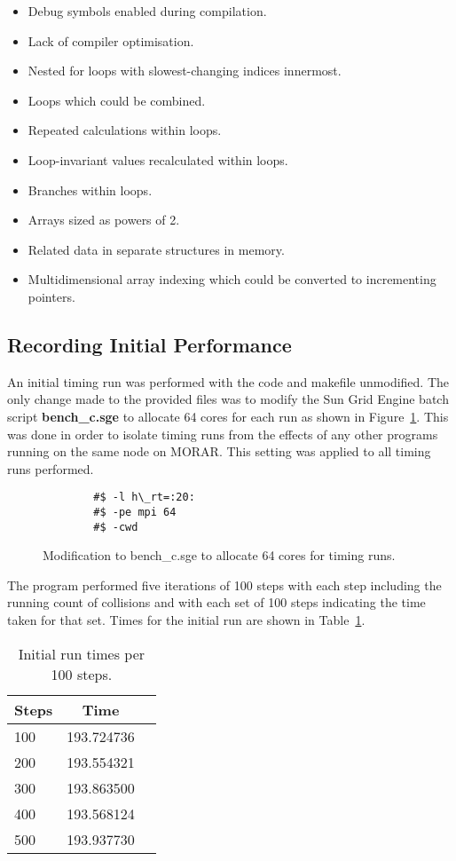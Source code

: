 \documentclass[11pt, oneside]{article}   %
\begin{document}
\begin{itemize}
	\item Debug symbols enabled during compilation.
	\item Lack of compiler optimisation.
	\item Nested for loops with slowest-changing indices innermost.
	\item Loops which could be combined.
	\item Repeated calculations within loops.
	\item Loop-invariant values recalculated within loops.
	\item Branches within loops.
	\item Arrays sized as powers of 2.
	\item Related data in separate structures in memory.
	\item Multidimensional array indexing which could be converted to incrementing pointers.
\end{itemize}


\subsection{Recording Initial Performance}
An initial timing run was performed with the code and makefile unmodified.
The only change made to the provided files was to modify the Sun Grid Engine batch script \textbf{bench\_c.sge} to allocate 64 cores for each run as shown in Figure~\ref{figure:batchsge}.
This was done in order to isolate timing runs from the effects of any other programs running on the same node on MORAR.
This setting was applied to all timing runs performed.

\begin{figure}
	\begin{lstlisting}
		#$ -l h\_rt=:20:
		#$ -pe mpi 64
		#$ -cwd
	\end{lstlisting}
	\caption{Modification to bench\_c.sge to allocate 64 cores for timing runs.}
	\label{figure:batchsge}
\end{figure}

The program performed five iterations of 100 steps with each step including the running count of collisions and with each set of 100 steps indicating the time taken for that set.
Times for the initial run are shown in Table~\ref{table:InitialRunTimes}.

\begin{table}[h]
	\begin{center}
		\begin{tabular}{||l|c|l||}
			\hline
				{\bf Steps} & {\bf Time}\\
			\hline
				100  &  193.724736\\
				200  &  193.554321\\
				300  &  193.863500\\
				400  &  193.568124\\
				500  &  193.937730\\
			\hline
		\end{tabular}
	\end{center}
	\caption{Initial run times per 100 steps.}
	\label{table:InitialRunTimes}
\end{table}
\end{document}
